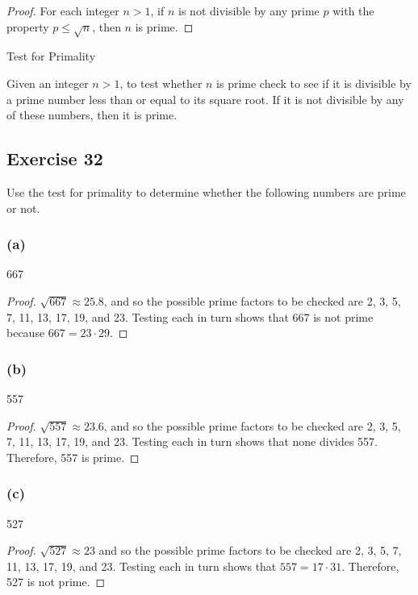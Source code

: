 \documentclass[14pt]{extarticle}
\newcommand{\cy}{\color{cyan}}
\begin{document}
\begin{proof}
For each integer $n>1$, if $n$ is not divisible by any prime $p$ with the property $p \leq \sqrt{n}$, then $n$ is prime.
\end{proof}

\begin{tcolorbox}[colframe=cyan]
\begin{center}
{\cy Test for Primality}
\end{center}
Given an integer $n > 1$, to test whether $n$ is prime check to see if it is divisible by a prime number less than or equal to its square root. If it is not divisible by any of these numbers, then it is prime.
\end{tcolorbox}

\subsection{Exercise 32}
Use the test for primality to determine whether the following numbers are prime or not.

\subsubsection{(a)}
667

\begin{proof}
$\sqrt{667} \approx 25.8$, and so the possible prime factors to be checked are 2, 3, 5, 7, 11, 13, 17, 19, and 23. Testing each in turn shows that 667 is not prime because $667 = 23 \cdot 29$.
\end{proof}

\subsubsection{(b)}
557

\begin{proof}
$\sqrt{557} \approx 23.6$, and so the possible prime factors to be checked are 2, 3, 5, 7, 11, 13, 17, 19, and 23. Testing each in turn shows that none divides 557. Therefore, 557 is prime.
\end{proof}

\subsubsection{(c)}
527

\begin{proof}
$\sqrt{527} \approx 23$ and so the possible prime factors to be checked are 2, 3, 5, 7, 11, 13, 17, 19, and 23. Testing each in turn shows that $557 = 17 \cdot 31$. Therefore, 527 is not prime.
\end{proof}
\end{document}
